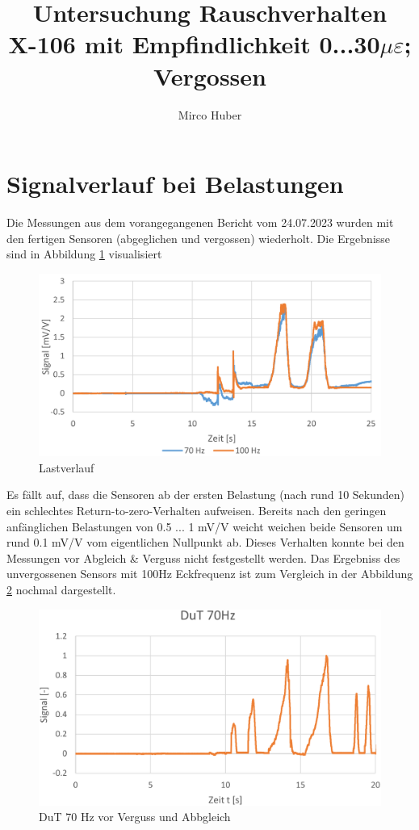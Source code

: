 \documentclass[12pt,a4paper]{article}
\title{Untersuchung Rauschverhalten\\[3ex] \small{ X-106 mit Empfindlichkeit 0...30$\mu\varepsilon$; Vergossen}}
\author{Mirco Huber}
\begin{document}
\maketitle
\newpage
\section{Signalverlauf bei Belastungen}
\noindent Die Messungen aus dem vorangegangenen Bericht vom 24.07.2023 wurden mit den fertigen Sensoren (abgeglichen und vergossen) wiederholt. Die Ergebnisse sind in Abbildung \ref{fig:vergleichlastverlauf} visualisiert
\begin{figure}[H]
	\centering
	\includegraphics[width=1\linewidth]{imgs/Vergleich_Lastverlauf}
	\caption{Lastverlauf}
	\label{fig:vergleichlastverlauf}
\end{figure}
\noindent
Es fällt auf, dass die Sensoren ab der ersten Belastung (nach rund 10 Sekunden) ein schlechtes Return-to-zero-Verhalten aufweisen. Bereits nach den geringen anfänglichen Belastungen von 0.5 ... 1 mV/V weicht weichen beide Sensoren um rund 0.1 mV/V vom eigentlichen Nullpunkt ab. Dieses Verhalten konnte bei den Messungen vor Abgleich \& Verguss nicht festgestellt werden. Das Ergebniss des unvergossenen Sensors mit 100Hz Eckfrequenz ist zum Vergleich in der Abbildung \ref{fig:dutsolounvergossen} nochmal dargestellt.
\begin{figure}[H]
	\centering
	\includegraphics[width=1\linewidth]{imgs/dut_solo_unvergossen}
	\caption{DuT 70 Hz vor Verguss und Abbgleich}
	\label{fig:dutsolounvergossen}
\end{figure}
\end{document}
